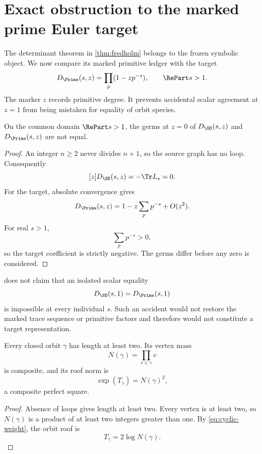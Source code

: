 \section{Exact obstruction to the marked prime Euler target}
\label{sec:target}

The determinant theorem in \cref{thm:fredholm} belongs to the frozen symbolic
object.  We now compare its marked primitive ledger with the target
\[
 D_{\Prime}(s,z)=\prod_p(1-zp^{-s}),
 \qquad
 \RePart s>1.
\]
The marker \(z\) records primitive degree.  It prevents accidental scalar
agreement at \(z=1\) from being mistaken for equality of orbit species.

\begin{theorem}
\label{thm:target-mismatch}
On the common domain \(\RePart s>1\), the germs at \(z=0\) of
\(D_{\SD}(s,z)\) and \(D_{\Prime}(s,z)\) are not equal.
\end{theorem}

\begin{proof}
An integer \(n\ge2\) never divides \(n+1\), so the source graph has no loop.
Consequently
\[
 [z]D_{\SD}(s,z)=-\Tr L_s=0.
\]
For the target, absolute convergence gives
\[
 D_{\Prime}(s,z)
 =
 1-z\sum_pp^{-s}+O(z^2).
\]
For real \(s>1\),
\[
 \sum_pp^{-s}>0,
\]
so the target coefficient is strictly negative.  The germs differ before
any zero is considered.
\end{proof}

\begin{remark}[Claim boundary at \(z=1\)]
\label{rem:z1}
 does not claim that an isolated scalar equality
\[
 D_{\SD}(s,1)=D_{\Prime}(s,1)
\]
is impossible at every individual \(s\).  Such an accident would not restore
the marked trace sequence or primitive factors and therefore would not
constitute a target representation.
\end{remark}

\begin{theorem}
\label{thm:orbit-species}
Every closed orbit \(\gamma\) has length at least two.  Its vertex mass
\[
 N(\gamma)=\prod_{v\in\gamma}v
\]
is composite, and its roof norm is
\[
 \exp(T_\gamma)=N(\gamma)^2,
\]
a composite perfect square.
\end{theorem}

\begin{proof}
Absence of loops gives length at least two.  Every vertex is at least two, so
\(N(\gamma)\) is a product of at least two integers greater than one.  By
\cref{eq:cyclic-weight}, the orbit roof is
\[
 T_\gamma=2\log N(\gamma).
\]
\end{proof}

